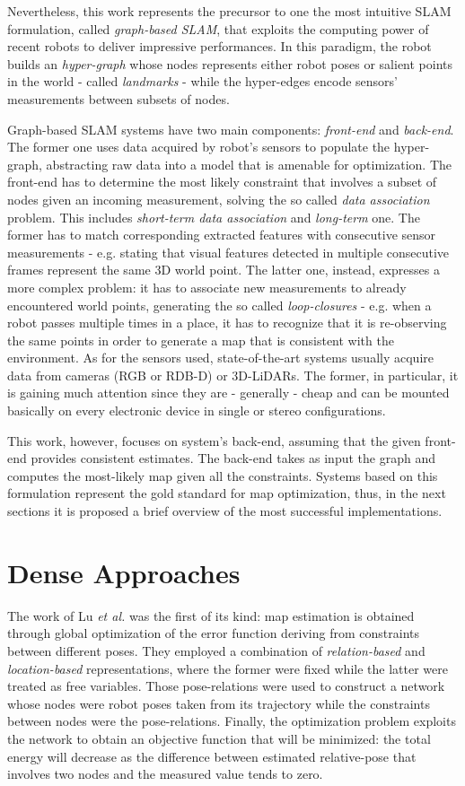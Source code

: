 Nevertheless, this work represents the precursor to one the most intuitive SLAM formulation, called \textit{graph-based SLAM}, that exploits the computing power of recent robots to deliver impressive performances. In this paradigm, the robot builds an \textit{hyper-graph} whose nodes represents either robot poses or salient points in the world - called \textit{landmarks} - while the hyper-edges encode sensors' measurements between subsets of nodes. 

Graph-based SLAM systems have two main components: \textit{front-end} and \textit{back-end}. The former one uses data acquired by robot's sensors to populate the hyper-graph, abstracting raw data into a model that is amenable for optimization. The front-end has to determine the most likely constraint that involves a subset of nodes given an incoming measurement, solving the so called \textit{data association} problem. This includes \textit{short-term data association} and \textit{long-term} one. The former has to match corresponding extracted features with consecutive sensor measurements - e.g. stating that visual features detected in multiple consecutive frames represent the same 3D world point. The latter one, instead, expresses a more complex problem: it has to associate new measurements to already encountered world points, generating the so called \textit{loop-closures} - e.g. when a robot passes multiple times in a place, it has to recognize that it is re-observing the same points in order to generate a map that is consistent with the environment. As for the sensors used, state-of-the-art systems usually acquire data from cameras (RGB or RDB-D) or 3D-LiDARs. The former, in particular, it is gaining much attention since they are - generally - cheap and can be mounted basically on every electronic device in single or stereo configurations. 

This work, however, focuses on system's back-end, assuming that the given front-end provides consistent estimates. The back-end takes as input the graph and computes the most-likely map given all the constraints. Systems based on this formulation represent the gold standard for map optimization, thus, in the next sections it is proposed a brief overview of the most successful implementations.

\section{Dense Approaches}
The work of Lu \textit{et al.} \cite{lu1997globally} was the first of its kind: map estimation is obtained through global optimization of the error function deriving from constraints between different poses. They employed a combination of \textit{relation-based} and \textit{location-based} representations, where the former were fixed while the latter were treated as free variables. Those pose-relations were used to construct a network whose nodes were robot poses taken from its trajectory while the constraints between nodes were the pose-relations. Finally, the optimization problem exploits the network to obtain an objective function that will be minimized: the total energy will decrease as the difference between estimated relative-pose that involves two nodes and the measured value tends to zero. 

